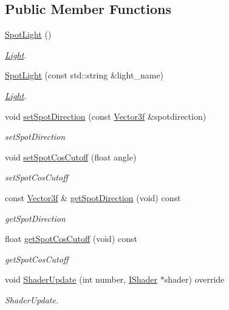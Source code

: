 \subsection*{Public Member Functions}
\begin{DoxyCompactItemize}
\item 
\hyperlink{classEngine_1_1SpotLight_ae4045cd7c8c6d18af39b57c9cf6f9ce6}{Spot\+Light} ()
\begin{DoxyCompactList}\small\item\em \hyperlink{classEngine_1_1Light}{Light}. \end{DoxyCompactList}\item 
\hyperlink{classEngine_1_1SpotLight_a49e6754dba77f5e52733229cda7c69a2}{Spot\+Light} (const std\+::string \&light\+\_\+name)
\begin{DoxyCompactList}\small\item\em \hyperlink{classEngine_1_1Light}{Light}. \end{DoxyCompactList}\item 
void \hyperlink{classEngine_1_1SpotLight_a2ab172c5ed395ec07e1ec22845750234}{set\+Spot\+Direction} (const \hyperlink{classVector3}{Vector3f} \&spotdirection)
\begin{DoxyCompactList}\small\item\em set\+Spot\+Direction \end{DoxyCompactList}\item 
void \hyperlink{classEngine_1_1SpotLight_ad3b7d45db0447681d5aa694c8782a949}{set\+Spot\+Cos\+Cutoff} (float angle)
\begin{DoxyCompactList}\small\item\em set\+Spot\+Cos\+Cutoff \end{DoxyCompactList}\item 
const \hyperlink{classVector3}{Vector3f} \& \hyperlink{classEngine_1_1SpotLight_aed7aa01d556fca73d03b8cb4612cb67b}{get\+Spot\+Direction} (void) const 
\begin{DoxyCompactList}\small\item\em get\+Spot\+Direction \end{DoxyCompactList}\item 
float \hyperlink{classEngine_1_1SpotLight_a66cc5159ef4efa4f6d479147615da039}{get\+Spot\+Cos\+Cutoff} (void) const 
\begin{DoxyCompactList}\small\item\em get\+Spot\+Cos\+Cutoff \end{DoxyCompactList}\item 
void \hyperlink{classEngine_1_1SpotLight_aa6f5b9024c2cab0fab556e4f66611fa4}{Shader\+Update} (int number, \hyperlink{classEngine_1_1IShader}{I\+Shader} $\ast$shader) override
\begin{DoxyCompactList}\small\item\em Shader\+Update. \end{DoxyCompactList}\end{DoxyCompactItemize}
